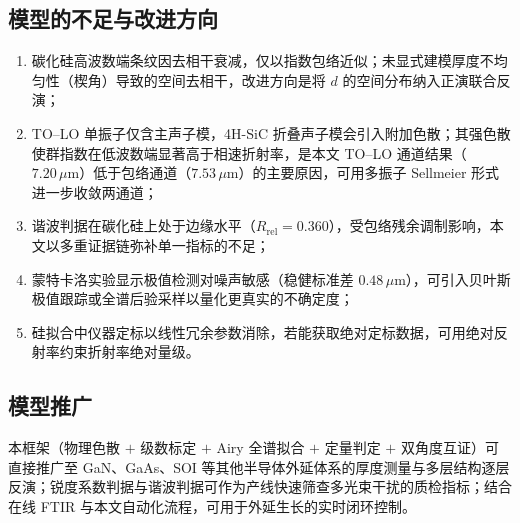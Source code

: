 \documentclass[11pt,a4paper,fontset=fandol]{ctexart}
\newcommand{\um}{\,\mu\mathrm{m}}
\begin{document}
\subsection{模型的不足与改进方向}
\begin{enumerate}[label=（\arabic*）, leftmargin=2.4em, itemsep=0.1em]
    \item 碳化硅高波数端条纹因去相干衰减，仅以指数包络近似；未显式建模厚度不均匀性（楔角）导致的空间去相干，改进方向是将 $d$ 的空间分布纳入正演联合反演；
    \item TO--LO 单振子仅含主声子模，4H-SiC 折叠声子模会引入附加色散；其强色散使群指数在低波数端显著高于相速折射率，是本文 TO--LO 通道结果（$7.20\um$）低于包络通道（$7.53\um$）的主要原因，可用多振子 Sellmeier 形式进一步收敛两通道；
    \item 谐波判据在碳化硅上处于边缘水平（$R_{\mathrm{rel}}=0.360$），受包络残余调制影响，本文以多重证据链弥补单一指标的不足；
    \item 蒙特卡洛实验显示极值检测对噪声敏感（稳健标准差 $0.48\um$），可引入贝叶斯极值跟踪或全谱后验采样以量化更真实的不确定度；
    \item 硅拟合中仪器定标以线性冗余参数消除，若能获取绝对定标数据，可用绝对反射率约束折射率绝对量级。
\end{enumerate}

\subsection{模型推广}
本框架（物理色散 $+$ 级数标定 $+$ Airy 全谱拟合 $+$ 定量判定 $+$ 双角度互证）可直接推广至 GaN、GaAs、SOI 等其他半导体外延体系的厚度测量与多层结构逐层反演；锐度系数判据与谐波判据可作为产线快速筛查多光束干扰的质检指标；结合在线 FTIR 与本文自动化流程，可用于外延生长的实时闭环控制。
\end{document}
